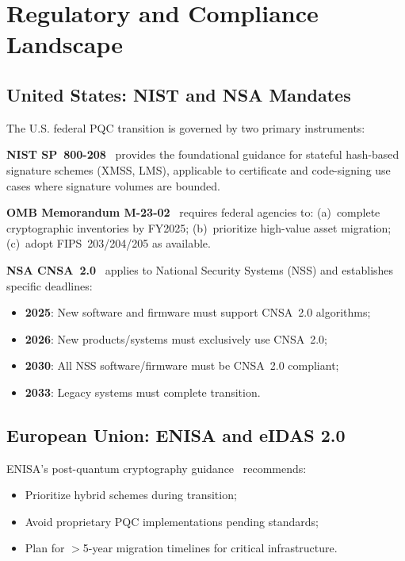 \documentclass[journal]{IEEEtran}
\begin{document}
\section{Regulatory and Compliance Landscape}
\label{sec:regulatory}

\subsection{United States: NIST and NSA Mandates}

The U.S. federal PQC transition is governed by two primary instruments:

\textbf{NIST SP~800-208}~\cite{nistsp800208} provides the foundational guidance
for stateful hash-based signature schemes (XMSS, LMS), applicable to
certificate and code-signing use cases where signature volumes are bounded.

\textbf{OMB Memorandum M-23-02}~\cite{omb2023m2302} requires federal agencies
to: (a)~complete cryptographic inventories by FY2025; (b)~prioritize high-value
asset migration; (c)~adopt FIPS~203/204/205 as available.

\textbf{NSA CNSA~2.0}~\cite{nsacnsa2022} applies to National Security Systems
(NSS) and establishes specific deadlines:
\begin{itemize}
  \item \textbf{2025}: New software and firmware must support CNSA~2.0 algorithms;
  \item \textbf{2026}: New products/systems must exclusively use CNSA~2.0;
  \item \textbf{2030}: All NSS software/firmware must be CNSA~2.0 compliant;
  \item \textbf{2033}: Legacy systems must complete transition.
\end{itemize}

\subsection{European Union: ENISA and eIDAS 2.0}

ENISA's post-quantum cryptography guidance~\cite{enisa2022pqc} recommends:
\begin{itemize}
  \item Prioritize hybrid schemes during transition;
  \item Avoid proprietary PQC implementations pending standards;
  \item Plan for $>$5-year migration timelines for critical infrastructure.
\end{itemize}
\end{document}
